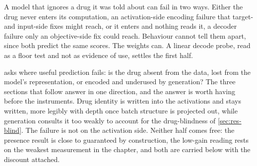 %


\begin{question}[3]
A model that ignores a drug it was told about can fail in two ways. Either the
drug never enters its computation, an activation-side encoding failure that
target- and input-side fixes might reach, or it enters and nothing reads it, a
decoder failure only an objective-side fix could reach. Behaviour cannot tell
them apart, since both predict the same scores. The weights can. A linear decode
probe, read as a floor test and not as evidence of use, settles the first half.
\end{question}

\noindent
{} asks where useful prediction fails: is the drug absent from
the data, lost from the model's representation, or encoded and underused by
generation? The three sections that follow answer in one direction, and the
answer is worth having before the instruments. Drug identity is written into the
activations and stays written, more legibly with depth once batch structure is
projected out, while generation consults it too weakly to account for the
drug-blindness of \cref{sec:res-blind}. The failure is not on the activation
side. Neither half comes free: the presence result is close to guaranteed by
construction, the low-gain reading rests on the weakest measurement in the
chapter, and both are carried below with the discount attached.

